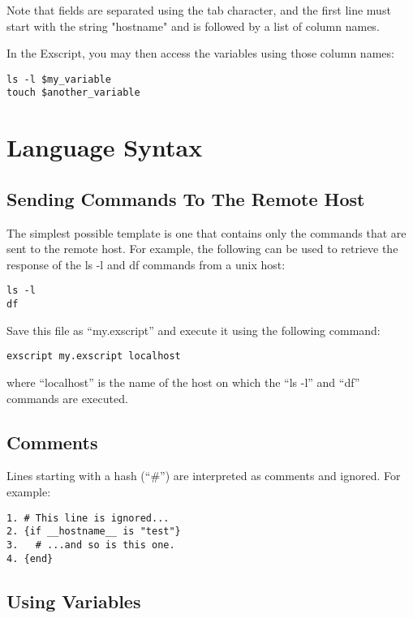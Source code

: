 Note that fields are separated using the tab character, and the first 
line must start with the string "hostname" and is followed by a list of 
column names.

In the Exscript, you may then access the variables using those column names: 

\begin{lstlisting}
ls -l $my_variable
touch $another_variable
\end{lstlisting}


\section{Language Syntax}
\subsection{Sending Commands To The Remote Host}

The simplest possible template is one that contains only the commands 
that are sent to the remote host. For example, the following \product 
can be used to retrieve the response of the ls -l and df commands from 
a unix host: 

\begin{lstlisting}
ls -l
df
\end{lstlisting}

Save this file as ``my.exscript'' and execute it using the following 
command: 

\begin{lstlisting}
exscript my.exscript localhost 
\end{lstlisting}

where ``localhost'' is the name of the host on which the ``ls -l'' 
and ``df'' commands are executed. 


\subsection{Comments}

Lines starting with a hash (``\#'') are interpreted as comments and ignored. 
For example: 

\begin{lstlisting}
1. # This line is ignored...
2. {if __hostname__ is "test"}
3.   # ...and so is this one.
4. {end}
\end{lstlisting}


\subsection{Using Variables}

